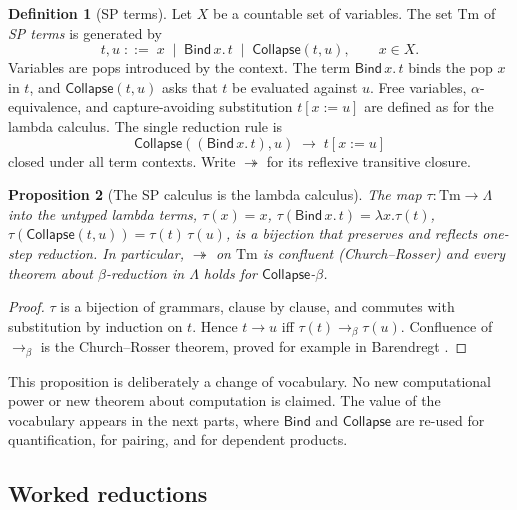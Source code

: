 \documentclass[11pt]{article}
\newcommand{\Bind}{\mathsf{Bind}}
\newcommand{\Coll}{\mathsf{Collapse}}
\newcommand{\lam}{\lambda}
\newcommand{\bnd}[2]{\Bind\,#1.\,#2}
\newcommand{\col}[2]{\Coll(#1,#2)}
\newcommand{\subst}[3]{#1[#2:=#3]}
\theoremstyle{definition}
\newtheorem{definition}{Definition}[section]
\theoremstyle{plain}
\newtheorem{proposition}[definition]{Proposition}
\theoremstyle{remark}
\begin{document}
\begin{definition}[SP terms]\label{def:sp}
Let $X$ be a countable set of variables. The set $\mathrm{Tm}$ of \emph{SP terms} is generated by
\[
t,u \;::=\; x \;\mid\; \bnd{x}{t} \;\mid\; \col{t}{u},\qquad x\in X.
\]
Variables are pops introduced by the context. The term $\bnd{x}{t}$ binds the pop $x$ in $t$, and $\col{t}{u}$ asks that $t$ be evaluated against $u$. Free variables, $\alpha$-equivalence, and capture-avoiding substitution $\subst{t}{x}{u}$ are defined as for the lambda calculus. The single reduction rule is
\[
\col{(\bnd{x}{t})}{u}\;\longrightarrow\;\subst{t}{x}{u}\tag{Collapse-$\beta$}
\]
closed under all term contexts. Write $\twoheadrightarrow$ for its reflexive transitive closure.
\end{definition}

\begin{proposition}[The SP calculus is the lambda calculus]\label{prop:sp-lambda}
The map $\tau:\mathrm{Tm}\to\Lambda$ into the untyped lambda terms, $\tau(x)=x$, $\tau(\bnd{x}{t})=\lam x.\tau(t)$, $\tau(\col{t}{u})=\tau(t)\,\tau(u)$, is a bijection that preserves and reflects one-step reduction. In particular, $\twoheadrightarrow$ on $\mathrm{Tm}$ is confluent (Church--Rosser) and every theorem about $\beta$-reduction in $\Lambda$ holds for $\Coll$-$\beta$.
\end{proposition}
\begin{proof}
$\tau$ is a bijection of grammars, clause by clause, and commutes with substitution by induction on $t$. Hence $t\to u$ iff $\tau(t)\to_\beta\tau(u)$. Confluence of $\to_\beta$ is the Church--Rosser theorem, proved for example in Barendregt \cite[Ch.~3]{Barendregt84}.
\end{proof}

This proposition is deliberately a change of vocabulary. No new computational power or new theorem about computation is claimed. The value of the vocabulary appears in the next parts, where $\Bind$ and $\Coll$ are re-used for quantification, for pairing, and for dependent products.

\subsection{Worked reductions}
\end{document}
